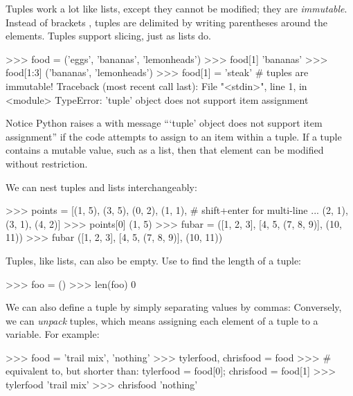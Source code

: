 \documentclass[11pt]{cselabheader}
\begin{document}
Tuples work a lot like lists, except they cannot be
modified; they are \emph{immutable}. Instead of brackets
\pythoninline{[]}, tuples are delimited by writing parentheses
\pythoninline{()} around the elements. Tuples support
slicing, just as lists do.

\begin{pyconcode}
>>> food = ('eggs', 'bananas', 'lemonheads')
>>> food[1]
'bananas'
>>> food[1:3]
('bananas', 'lemonheads')
>>> food[1] = 'steak' # tuples are immutable!
Traceback (most recent call last):
  File "<stdin>", line 1, in <module>
TypeError: 'tuple' object does not support item assignment

\end{pyconcode}

Notice Python raises a  with message
```tuple' object does not support item assignment'' if the code
attempts to assign to an item within a tuple.
If a tuple contains a mutable value, such as a list, then that
element can be modified without restriction.

We can nest tuples and lists interchangeably:

\begin{pyconcode}
>>> points = [(1, 5), (3, 5), (0, 2), (1, 1),  # shift+enter for multi-line
...           (2, 1), (3, 1), (4, 2)]
>>> points[0]
(1, 5)
>>> fubar = ([1, 2, 3], [4, 5, (7, 8, 9)], (10, 11))
>>> fubar
([1, 2, 3], [4, 5, (7, 8, 9)], (10, 11))

\end{pyconcode}

Tuples, like lists, can also be empty. Use  to find the
length of a tuple:

\begin{pyconcode}
>>> foo = ()
>>> len(foo)
0

\end{pyconcode}

We can also define a tuple by simply separating values by commas:
Conversely, we can \emph{unpack} tuples, which
means assigning each element of a tuple to a variable. For example:

\begin{pyconcode}
>>> food = 'trail mix', 'nothing'
>>> tylerfood, chrisfood = food
>>> # equivalent to, but shorter than: tylerfood = food[0]; chrisfood = food[1]
>>> tylerfood
'trail mix'
>>> chrisfood
'nothing'

\end{pyconcode}
\end{document}
